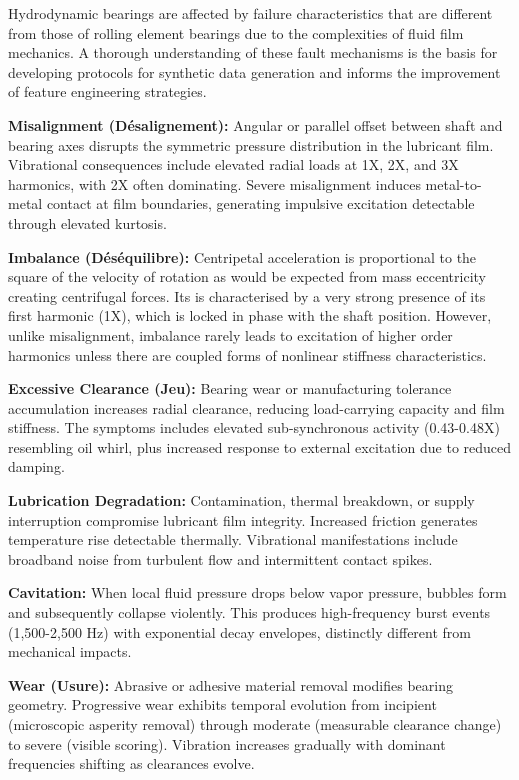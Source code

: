 \documentclass[11pt,a4paper]{article}
\begin{document}
Hydrodynamic bearings are affected by failure characteristics that are different from those of rolling element bearings due to the complexities of fluid film mechanics. A thorough understanding of these fault mechanisms is the basis for developing protocols for synthetic data generation and informs the improvement of feature engineering strategies.

\textbf{Misalignment (Désalignement):} Angular or parallel offset between shaft and bearing axes disrupts the symmetric pressure distribution in the lubricant film. Vibrational consequences include elevated radial loads at 1X, 2X, and 3X harmonics, with 2X often dominating. Severe misalignment induces metal-to-metal contact at film boundaries, generating impulsive excitation detectable through elevated kurtosis.

\textbf{Imbalance (Déséquilibre):} Centripetal acceleration is proportional to the square of the velocity of rotation as would be expected from mass eccentricity creating centrifugal forces. Its is characterised by a very strong presence of its first harmonic (1X), which is locked in phase with the shaft position. However, unlike misalignment, imbalance rarely leads to excitation of higher order harmonics unless there are coupled forms of nonlinear stiffness characteristics.

\textbf{Excessive Clearance (Jeu):} Bearing wear or manufacturing tolerance accumulation increases radial clearance, reducing load-carrying capacity and film stiffness. The symptoms includes elevated sub-synchronous activity (0.43-0.48X) resembling oil whirl, plus increased response to external excitation due to reduced damping.

\textbf{Lubrication Degradation:} Contamination, thermal breakdown, or supply interruption compromise lubricant film integrity. Increased friction generates temperature rise detectable thermally. Vibrational manifestations include broadband noise from turbulent flow and intermittent contact spikes.

\textbf{Cavitation:} When local fluid pressure drops below vapor pressure, bubbles form and subsequently collapse violently. This produces high-frequency burst events (1,500-2,500 Hz) with exponential decay envelopes, distinctly different from mechanical impacts.

\textbf{Wear (Usure):} Abrasive or adhesive material removal modifies bearing geometry. Progressive wear exhibits temporal evolution from incipient (microscopic asperity removal) through moderate (measurable clearance change) to severe (visible scoring). Vibration increases gradually with dominant frequencies shifting as clearances evolve.
\end{document}
